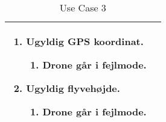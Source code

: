 \begin{table}[H]
\begin{tabular}{|l|p{10cm}|}
									\renewcommand{\labelenumi}{\Roman{enumi}:}
									\renewcommand{\labelenumii}{\alph{enumii})}
									\begin{enumerate}[topsep=0.0cm,leftmargin=0.5cm]
										\item Ugyldig GPS koordinat.
											\begin{enumerate}[topsep=0cm, leftmargin=1cm]
												\item Drone går i fejlmode.
											\end{enumerate}
										\item Ugyldig flyvehøjde.
											\begin{enumerate}[topsep=0cm, leftmargin=1cm]
												\item Drone går i fejlmode.
											\end{enumerate}
									\end{enumerate} \\\hline	

\end{tabular}
\caption{Use Case 3}
\label{tab:UC3}
\end{table}